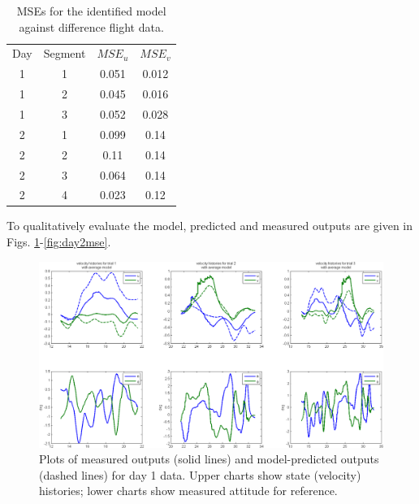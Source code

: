 \documentclass{article}
\begin{document}
\begin{table}[tb!]
\centering
\begin{tabular}{c|c|c|c}
Day & Segment & $MSE_u$ & $MSE_v$ \\
1 & 1 & 0.051 & 0.012 \\
1 & 2 & 0.045  &   0.016\\
1 & 3 & 0.052  &   0.028\\
2 & 1 & 0.099  &    0.14\\
2 & 2 & 0.11  &     0.14\\
2 & 3 & 0.064 &   0.14\\
2 & 4 & 0.023  &   0.12\\
\end{tabular}
\caption{MSEs for the identified model against difference flight data.}
\label{tab:mses}
\end{table}

To qualitatively evaluate the model, predicted and measured outputs are given in Figs. \ref{fig:day1mse}-\ref{fig:day2mse}.

\begin{figure}[tb!]
\centering
\includegraphics[width = \textwidth]{../../near system identification/model_day_1.png}
\caption{Plots of measured outputs (solid lines) and model-predicted outputs (dashed lines) for day 1 data. Upper charts show state (velocity) histories; lower charts show measured attitude for reference.}
\label{fig:day1mse}
\end{figure}
\end{document}
